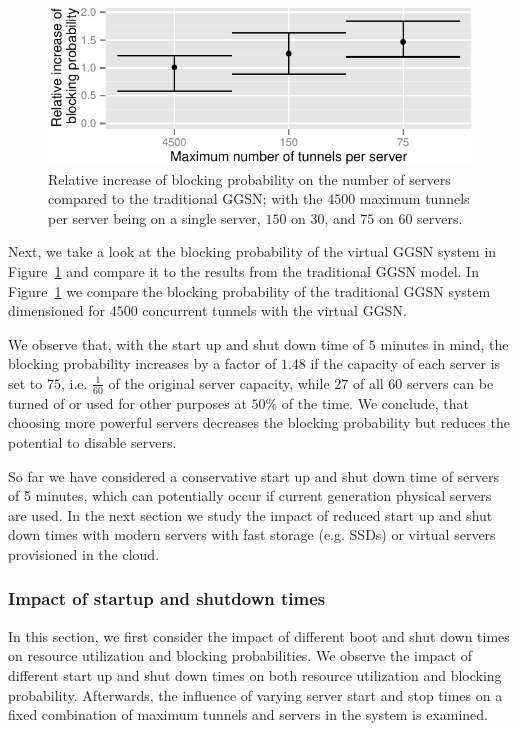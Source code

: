 \begin{figure}[htb]
  \centering
  \includegraphics{images/blocking-comparison.pdf}
  \caption{Relative increase of blocking probability on the number of servers compared to the traditional \gls{GGSN}; with the $4500$ maximum tunnels per server being on a single server, $150$ on $30$, and $75$ on $60$ servers.}
 \label{c4:fig:blocking-comparison}
\end{figure}

Next, we take a look at the blocking probability of the virtual \gls{GGSN} system in Figure~\ref{c4:fig:blocking-comparison} and compare it to the results from the traditional \gls{GGSN} model. In Figure~\ref{c4:fig:blocking-comparison} we compare the blocking probability of the traditional \gls{GGSN} system dimensioned for $4500$ concurrent tunnels with the virtual \gls{GGSN}.

We observe that, with the start up and shut down time of $5$ minutes in mind, the blocking probability increases by a factor of $1.48$ if the capacity of each server is set to $75$, i.e. $\frac{1}{60}$ of the original server capacity, while $27$ of all $60$ servers can be turned of or used for other purposes at $50\%$ of the time. We conclude, that choosing more powerful servers decreases the blocking probability but reduces the potential to disable servers.

So far we have considered a conservative start up and shut down time of servers of 5 minutes, which can potentially occur if current generation physical servers are used.
In the next section we study the impact of reduced start up and shut down times with modern servers with fast storage (e.g. \glspl{SSD}) or virtual servers provisioned in the cloud.


\subsubsection{Impact of startup and shutdown times}
\label{c4:sec:real_virtual_ggsn}

In this section, we first consider the impact of different boot and shut down times on resource utilization and blocking probabilities. We observe the impact of different start up and shut down times on both resource utilization and blocking probability. Afterwards, the influence of varying server start and stop times on a fixed combination of maximum tunnels and servers in the system is examined.

